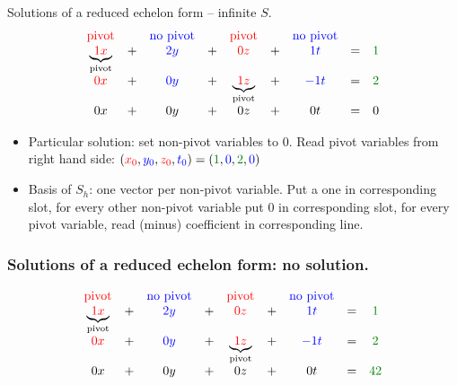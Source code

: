 \documentclass{beamer}
\begin{document}
\begin{frame}{Solutions of a reduced echelon form -- infinite $S$.}
  \[\begin{array}{ccccccccc}
  {\color{red} \textnormal{pivot}} & &{\color{blue} \textnormal{no pivot}} & & {\color{red} \textnormal{pivot}} & & {\color{blue} \textnormal{no pivot}}\\
  \underbrace{{\color{red} 1x}}_{\textnormal{pivot}} & + & {\color{blue}2y} & + &{\color{red}{0}  z}  &  + & {\color{blue}1t} & = & {\color{darkgreen}1}\\
  {\color{red} 0x} & + &{\color{blue} 0y} & +  &  \underbrace{{\color{red}1z}}_{\textnormal{pivot}}  &  + & {\color{blue}-1t} & = & {\color{darkgreen}2}\\
  0x & + & 0y & +  &  0z  &  + & 0t & = & 0\\    
  \end{array}\]

    \begin{itemize}
    \item<3-> Particular solution: set non-pivot variables to $0$. Read pivot variables from right hand side: $({\color{red}x_0}, {\color{blue}y_0}, {\color{red}z_0}, {\color{blue}t_0}) = ({\color{darkgreen} 1}, {\color{blue} 0}, {\color{darkgreen} 2}, {\color{blue} 0})$
    \item<4-> Basis of $S_h$: one vector per non-pivot variable. Put a one in corresponding slot, for every other non-pivot variable put $0$ in corresponding slot, for every pivot variable, read (minus) coefficient in corresponding line. 
    \end{itemize}
\end{frame}



\begin{frame}
  \frametitle{Solutions of a reduced echelon form: no solution.}
  \[\begin{array}{ccccccccc}
  {\color{red} \textnormal{pivot}} & &{\color{blue} \textnormal{no pivot}} & & {\color{red} \textnormal{pivot}} & & {\color{blue} \textnormal{no pivot}}\\
  \underbrace{{\color{red} 1x}}_{\textnormal{pivot}} & + & {\color{blue}2y} & + &{\color{red}{0}  z}  &  + & {\color{blue}1t} & = & {\color{darkgreen}1}\\
  {\color{red} 0x} & + &{\color{blue} 0y} & +  &  \underbrace{{\color{red}1z}}_{\textnormal{pivot}}  &  + & {\color{blue}-1t} & = & {\color{darkgreen}2}\\
  0x & + & 0y & +  &  0z  &  + & 0t & = & {\color{darkgreen} 42}\\    
  \end{array}\]
  
\end{frame}
\end{document}
